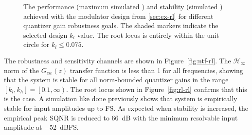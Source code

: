 \begin{figure}
	\begin{NoHyper}
		\begin{center}
		\end{center}
	\end{NoHyper}
	\caption{The performance (maximum simulated ) and stability (simulated ) achieved with the modulator design from \autoref{sec:ex-rl} for different quantizer gain robustness goals. The shaded markers indicate the selected design $k_l$ value. The root locus is entirely within the unit circle for $k_l \leq 0.075$.} \label{fig:robust-perf-stab}
\end{figure}

The robustness and sensitivity channels are shown in Figure~\ref{fig:ntf-rl}. The $\mathcal{H}_\infty$ norm of the $G_{zw}(z)$ transfer function is less than 1 for all frequencies, showing that the system is stable for all norm-bounded quantizer gains in the range $\left[k_l, k_h\right] = \left[0.1, \infty\right)$. The root locus shown in Figure~\ref{fig:rl-rl} confirms that this is the case. A simulation like done previously shows that system is empirically stable for input amplitudes up to \gls{FS}. As expected when stability is increased, the empirical peak SQNR is reduced to \SI{66}{\deci\bel} with the minimum resolvable input amplitude at \SI{-52}{\deci\bel}\gls{FS}.

